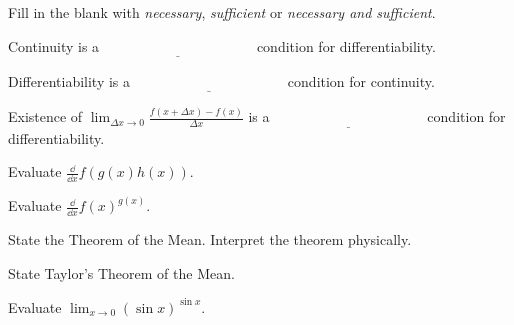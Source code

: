 \begin{QuizProblem}
  \label{quiz problem necessary sufficient continuity differentiability}
  Fill in the blank with \textit{necessary}, \textit{sufficient} or
  \textit{necessary and sufficient}.

  Continuity is a $\underline{\phantom{necessary and sufficient}}$ condition 
  for differentiability.

  Differentiability is a $\underline{\phantom{necessary and sufficient}}$ 
  condition for continuity.

  Existence of $\lim_{\Delta x \to 0} \frac{f(x+\Delta x) - f(x)}{\Delta x}$ is a 
  $\underline{\phantom{necessary and sufficient}}$ condition for
  differentiability.

\end{QuizProblem}


\begin{QuizProblem}
  \label{quiz problem ddx f(g(x)h(x))}
  Evaluate $\frac{\dd}{\dd x} f(g(x) h(x))$.

\end{QuizProblem}


\begin{QuizProblem}
  \label{quiz problem ddx f(x)g(x)}
  Evaluate $\frac{\dd}{\dd x} f(x)^{g(x)}$.

\end{QuizProblem}


\begin{QuizProblem}
  \label{quiz problem theorem of the mean}
  State the Theorem of the Mean.  Interpret the theorem physically.

\end{QuizProblem}


\begin{QuizProblem}
  \label{quiz problem taylor's theorem of the mean}
  State Taylor's Theorem of the Mean.

\end{QuizProblem}


\begin{QuizProblem}
  \label{quiz problem lim sin sin}
  Evaluate $\lim_{x \to 0} (\sin x)^{\sin x}$.

\end{QuizProblem}









